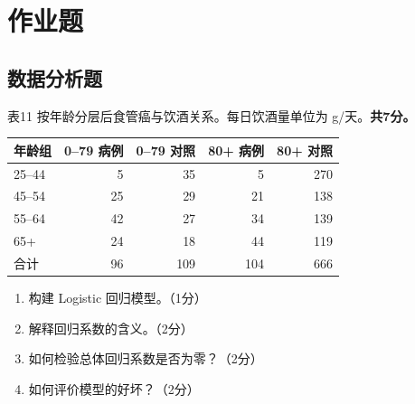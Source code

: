 
\label{chapter:2}

\par\addvspace{8pt}\noindent\begin{minipage}{\linewidth}

\section{作业题}

\subsection{数据分析题}


表11 按年龄分层后食管癌与饮酒关系。每日饮酒量单位为 g/天。\textbf{共7分。}

\begin{center}\small\setlength{\tabcolsep}{4pt}\renewcommand{\arraystretch}{1.22}\begin{tabular}{@{}lrrrr@{}}
\toprule
年龄组 & 0--79 病例 & 0--79 对照 & 80+ 病例 & 80+ 对照 \\
\midrule

25--44 & 5 & 35 & 5 & 270 \\
45--54 & 25 & 29 & 21 & 138 \\
55--64 & 42 & 27 & 34 & 139 \\
65+ & 24 & 18 & 44 & 119 \\
合计 & 96 & 109 & 104 & 666 \\
\bottomrule\end{tabular}\end{center}

\begin{enumerate}
\def\labelenumi{\arabic{enumi}.}
\tightlist
\item
  构建 Logistic 回归模型。（1分）
\item
  解释回归系数的含义。（2分）
\item
  如何检验总体回归系数是否为零？（2分）
\item
  如何评价模型的好坏？（2分）
\end{enumerate}



\end{minipage}\par\vspace{5pt}

